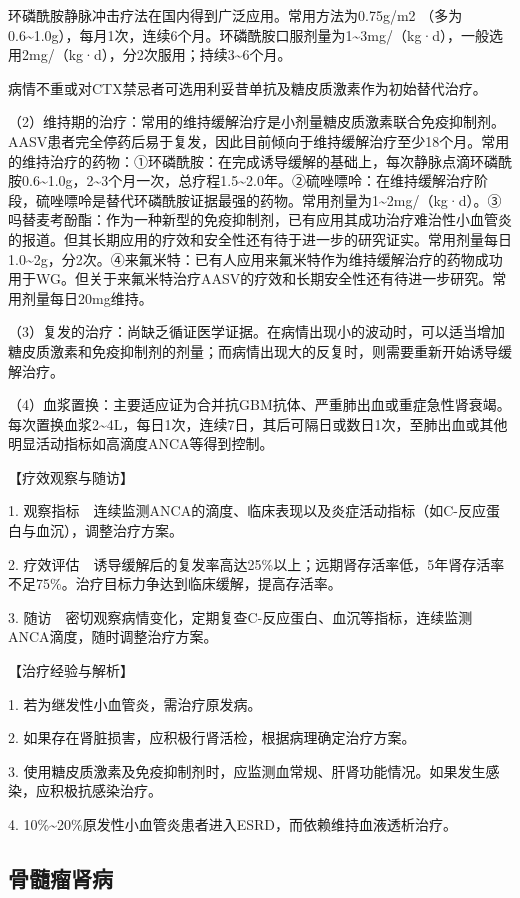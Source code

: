 环磷酰胺静脉冲击疗法在国内得到广泛应用。常用方法为0.75g/m{2}
（多为0.6\textasciitilde{}1.0g），每月1次，连续6个月。环磷酰胺口服剂量为1\textasciitilde{}3mg/（kg·d），一般选用2mg/（kg·d），分2次服用；持续3\textasciitilde{}6个月。

病情不重或对CTX禁忌者可选用利妥昔单抗及糖皮质激素作为初始替代治疗。

（2）维持期的治疗：常用的维持缓解治疗是小剂量糖皮质激素联合免疫抑制剂。AASV患者完全停药后易于复发，因此目前倾向于维持缓解治疗至少18个月。常用的维持治疗的药物：①环磷酰胺：在完成诱导缓解的基础上，每次静脉点滴环磷酰胺0.6\textasciitilde{}1.0g，2\textasciitilde{}3个月一次，总疗程1.5\textasciitilde{}2.0年。②硫唑嘌呤：在维持缓解治疗阶段，硫唑嘌呤是替代环磷酰胺证据最强的药物。常用剂量为1\textasciitilde{}2mg/（kg·d）。③吗替麦考酚酯：作为一种新型的免疫抑制剂，已有应用其成功治疗难治性小血管炎的报道。但其长期应用的疗效和安全性还有待于进一步的研究证实。常用剂量每日1.0\textasciitilde{}2g，分2次。④来氟米特：已有人应用来氟米特作为维持缓解治疗的药物成功用于WG。但关于来氟米特治疗AASV的疗效和长期安全性还有待进一步研究。常用剂量每日20mg维持。

（3）复发的治疗：尚缺乏循证医学证据。在病情出现小的波动时，可以适当增加糖皮质激素和免疫抑制剂的剂量；而病情出现大的反复时，则需要重新开始诱导缓解治疗。

（4）血浆置换：主要适应证为合并抗GBM抗体、严重肺出血或重症急性肾衰竭。每次置换血浆2\textasciitilde{}4L，每日1次，连续7日，其后可隔日或数日1次，至肺出血或其他明显活动指标如高滴度ANCA等得到控制。

【疗效观察与随访】

1.
观察指标　连续监测ANCA的滴度、临床表现以及炎症活动指标（如C-反应蛋白与血沉），调整治疗方案。

2.
疗效评估　诱导缓解后的复发率高达25\%以上；远期肾存活率低，5年肾存活率不足75\%。治疗目标力争达到临床缓解，提高存活率。

3.
随访　密切观察病情变化，定期复查C-反应蛋白、血沉等指标，连续监测ANCA滴度，随时调整治疗方案。

【治疗经验与解析】

1. 若为继发性小血管炎，需治疗原发病。

2. 如果存在肾脏损害，应积极行肾活检，根据病理确定治疗方案。

3.
使用糖皮质激素及免疫抑制剂时，应监测血常规、肝肾功能情况。如果发生感染，应积极抗感染治疗。

4.
10\%\textasciitilde{}20\%原发性小血管炎患者进入ESRD，而依赖维持血液透析治疗。

\subsection{骨髓瘤肾病}

